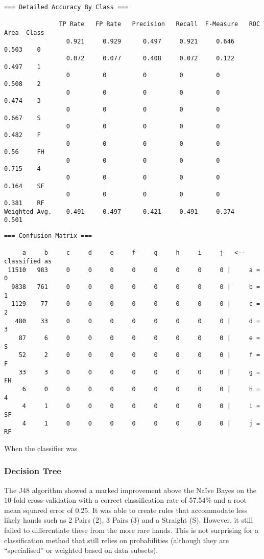 \documentclass[11pt, a4paper]{article}
\begin{document}
\begin{verbatim}
=== Detailed Accuracy By Class ===

               TP Rate   FP Rate   Precision   Recall  F-Measure   ROC Area  Class
                 0.921     0.929      0.497     0.921     0.646      0.503    0
                 0.072     0.077      0.408     0.072     0.122      0.497    1
                 0         0          0         0         0          0.508    2
                 0         0          0         0         0          0.474    3
                 0         0          0         0         0          0.667    S
                 0         0          0         0         0          0.482    F
                 0         0          0         0         0          0.56     FH
                 0         0          0         0         0          0.715    4
                 0         0          0         0         0          0.164    SF
                 0         0          0         0         0          0.381    RF
Weighted Avg.    0.491     0.497      0.421     0.491     0.374      0.501
\end{verbatim}

\begin{verbatim}
=== Confusion Matrix ===

     a     b     c     d     e     f     g     h     i     j   <-- classified as
 11510   983     0     0     0     0     0     0     0     0 |     a = 0
  9838   761     0     0     0     0     0     0     0     0 |     b = 1
  1129    77     0     0     0     0     0     0     0     0 |     c = 2
   480    33     0     0     0     0     0     0     0     0 |     d = 3
    87     6     0     0     0     0     0     0     0     0 |     e = S
    52     2     0     0     0     0     0     0     0     0 |     f = F
    33     3     0     0     0     0     0     0     0     0 |     g = FH
     6     0     0     0     0     0     0     0     0     0 |     h = 4
     4     1     0     0     0     0     0     0     0     0 |     i = SF
     4     1     0     0     0     0     0     0     0     0 |     j = RF
\end{verbatim}

When the classifier was 
\subsubsection*{Decision Tree}

The J48 algorithm showed a marked improvement above the Na\"ive Bayes on the 10-fold cross-validation with a correct classification rate of 57.54\% and a root mean squared error of 0.25. It was able to create rules that accommodate less likely hands such as 2 Pairs (2), 3 Pairs (3) and a Straight (S). However, it still failed to differentiate these from the more rare hands. This is not surprising for a classification method that still relies on probabilities (although they are ``specialised'' or weighted based on data subsets). 
\end{document}
